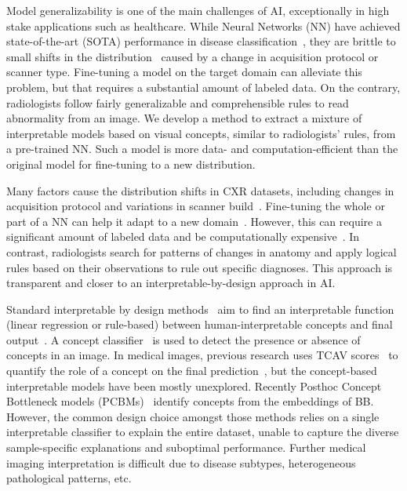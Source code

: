 Model generalizability is one of the main challenges of AI, exceptionally in high stake applications such as healthcare. While Neural Networks (NN) have achieved state-of-the-art (SOTA) performance in disease classification~\cite{irvin2019chexpert, rajpurkar2017chexnet, yu2022anatomy}, they are brittle to small shifts in the distribution~\cite{guan2021domain} caused by a change in acquisition protocol or scanner type. Fine-tuning a model on the target domain can alleviate this problem, but that requires a substantial amount of labeled data. On the contrary, radiologists follow fairly generalizable and comprehensible rules to read abnormality from an image. We develop a method to extract a mixture of interpretable models based on visual concepts, similar to radiologists' rules, from a pre-trained NN. Such a model is more data- and computation-efficient than the original model for fine-tuning to a new distribution.

Many factors cause the distribution shifts in CXR datasets, including changes in acquisition protocol and variations in scanner build~\cite{yan2020mri}. Fine-tuning the whole or part of a NN can help it adapt to a new domain~\cite{chu2016best}. However, this can require a significant amount of labeled data and be computationally expensive~\cite{wang2017growing, kandel2020deeply}. In contrast, radiologists search for patterns of changes in anatomy and apply logical rules based on their observations to rule out specific diagnoses. This approach is transparent and closer to an interpretable-by-design approach in AI.

Standard interpretable by design methods~\cite{rudin2022interpretable} aim to find an interpretable function (\eg linear regression or rule-based) between human-interpretable concepts and final output~\cite{koh2020concept}. A concept classifier~\cite{sarkar2021inducing, zarlenga2022concept} is used to detect the presence or absence of concepts in an image. In medical images, previous research uses TCAV scores~\cite{kim2017interpretability} to quantify the role of a concept on the final prediction~\cite{yeche2019ubs, graziani2020concept, clough2019global}, but the concept-based interpretable models have been mostly unexplored.
Recently Posthoc Concept Bottleneck models (PCBMs)~\cite{yuksekgonul2022post} identify concepts from the embeddings of BB. However, the common design choice amongst those methods relies on a single interpretable classifier to explain the entire dataset, unable to capture the diverse sample-specific explanations and suboptimal performance. Further medical imaging interpretation is difficult due to disease subtypes, heterogeneous pathological patterns, etc.


